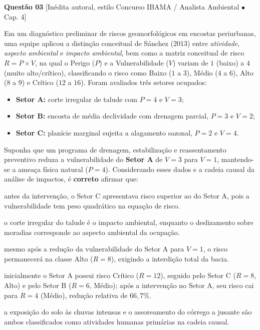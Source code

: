 \vspace{6pt}
\noindent\textbf{Questão 03} {\footnotesize\color{uefsMuted}[Inédita autoral, estilo Concurso IBAMA / Analista Ambiental $\bullet$ Cap. 4]}\par
Em um diagnóstico preliminar de riscos geomorfológicos em encostas periurbanas, uma equipe aplicou a distinção conceitual de Sánchez (2013) entre \textit{atividade}, \textit{aspecto ambiental} e \textit{impacto ambiental}, bem como a matriz conceitual de risco $R = P \times V$, na qual o Perigo ($P$) e a Vulnerabilidade ($V$) variam de $1$ (baixo) a $4$ (muito alto/crítico), classificando o risco como Baixo ($1$ a $3$), Médio ($4$ a $6$), Alto ($8$ a $9$) e Crítico ($12$ a $16$). Foram avaliados três setores ocupados:
\begin{itemize}[leftmargin=1.8em, itemsep=1.5pt, topsep=3pt]
  \item \textbf{Setor A:} corte irregular de talude com $P = 4$ e $V = 3$;
  \item \textbf{Setor B:} encosta de média declividade com drenagem parcial, $P = 3$ e $V = 2$;
  \item \textbf{Setor C:} planície marginal sujeita a alagamento sazonal, $P = 2$ e $V = 4$.
\end{itemize}
Suponha que um programa de drenagem, estabilização e reassentamento preventivo reduza a vulnerabilidade do \textbf{Setor A} de $V = 3$ para $V = 1$, mantendo-se a ameaça física natural ($P = 4$). Considerando esses dados e a cadeia causal da análise de impactos, é \textbf{correto} afirmar que:
\begin{alternativas}
  \item antes da intervenção, o Setor C apresentava risco superior ao do Setor A, pois a vulnerabilidade tem peso quadrático na equação de risco.
  \item o corte irregular do talude é o impacto ambiental, enquanto o deslizamento sobre moradias corresponde ao aspecto ambiental da ocupação.
  \item mesmo após a redução da vulnerabilidade do Setor A para $V = 1$, o risco permanecerá na classe Alto ($R = 8$), exigindo a interdição total da bacia.
  \item inicialmente o Setor A possui risco Crítico ($R = 12$), seguido pelo Setor C ($R = 8$, Alto) e pelo Setor B ($R = 6$, Médio); após a intervenção no Setor A, seu risco cai para $R = 4$ (Médio), redução relativa de $66,7\%$.
  \item a exposição do solo às chuvas intensas e o assoreamento do córrego a jusante são ambos classificados como atividades humanas primárias na cadeia causal.
\end{alternativas}

